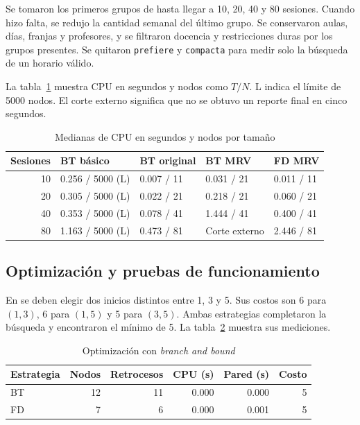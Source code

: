 \documentclass[11pt]{article}
\begin{document}
Se tomaron los primeros grupos de  hasta llegar a 10, 20, 40 y 80 sesiones. Cuando hizo falta, se redujo la cantidad semanal del último grupo. Se conservaron aulas, días, franjas y profesores, y se filtraron docencia y restricciones duras por los grupos presentes. Se quitaron \texttt{prefiere} y \texttt{compacta} para medir solo la búsqueda de un horario válido.

La tabla~\ref{tab-tamano} muestra CPU en segundos y nodos como $T/N$. L indica el límite de 5000 nodos. El corte externo significa que no se obtuvo un reporte final en cinco segundos.

\begin{table}[htbp]
    \centering
    \small
    \begin{tabular}{r|l|l|l|l}
        \hline
        Sesiones & BT básico & BT original & BT MRV & FD MRV \\
        \hline
10 & 0.256 / 5000 (L) & 0.007 / 11 & 0.031 / 21 & 0.011 / 11 \\
20 & 0.305 / 5000 (L) & 0.022 / 21 & 0.218 / 21 & 0.060 / 21 \\
40 & 0.353 / 5000 (L) & 0.078 / 41 & 1.444 / 41 & 0.400 / 41 \\
80 & 1.163 / 5000 (L) & 0.473 / 81 & Corte externo & 2.446 / 81 \\
        \hline
    \end{tabular}
    \caption{Medianas de CPU en segundos y nodos por tamaño}
    \label{tab-tamano}
\end{table}
\FloatBarrier

\subsection{Optimización y pruebas de funcionamiento}

En  se deben elegir dos inicios distintos entre 1, 3 y 5. Sus costos son 6 para $(1,3)$, 6 para $(1,5)$ y 5 para $(3,5)$. Ambas estrategias completaron la búsqueda y encontraron el mínimo de 5. La tabla~\ref{tab-optimizacion} muestra sus mediciones.

\begin{table}[htbp]
    \centering
    \begin{tabular}{l|r|r|r|r|r}
        \hline
        Estrategia & Nodos & Retrocesos & CPU (s) & Pared (s) & Costo \\
        \hline
BT & 12 & 11 & 0.000 & 0.000 & 5 \\
FD & 7 & 6 & 0.000 & 0.001 & 5 \\
        \hline
    \end{tabular}
    \caption{Optimización con \emph{branch and bound}}
    \label{tab-optimizacion}
\end{table}
\end{document}
